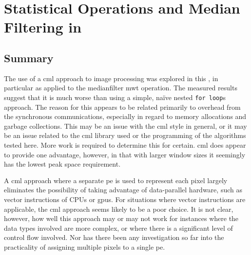 \newcommand{\hopac}{Hopac}
\chapter{\label{chap:median}Statistical Operations and Median Filtering in }






\section{Summary}
The use of a \gls{cml} approach to image processing was explored in this , in particular as applied to the \gls{medianfilter} \gls{mwt} operation.  The measured results suggest that it is much worse than using a simple, naïve nested \texttt{for loop}s approach.  The reason for this appears to be related primarily to overhead from the synchronous communications, especially in regard to memory allocations and garbage collections.  This may be an issue with the \gls{cml} style in general, or it may be an issue related to the \gls{cml} library used or the programming of the algorithms tested here.  More work is required to determine this for certain.  \Gls{cml} does appear to provide one advantage, however, in that with larger window sizes it seemingly has the lowest peak space requirement.

A \gls{cml} approach where a separate \gls{pe} is used to represent each pixel largely eliminates the possibility of taking advantage of data-parallel hardware, such as vector instructions of CPUs or \glspl{gpu}.  For situations where vector instructions are applicable, the \gls{cml} approach seems likely to be a poor choice.  It is not clear, however, how well this approach may or may not work for instances where the data types involved are more complex, or where there is a significant level of control flow involved.  Nor has there been any investigation so far into the practicality of assigning multiple pixels to a single \gls{pe}.